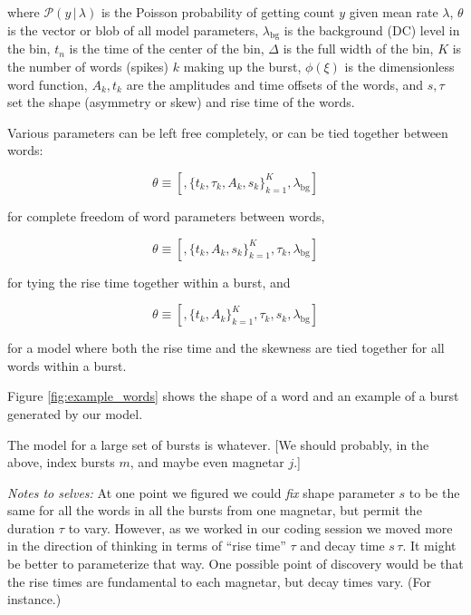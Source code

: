 \documentclass[12pt]{article}
\newcommand{\given}{\,|\,}
\renewcommand{\count}{y}
\newcommand{\pars}{\theta}
\newcommand{\mean}{\lambda}
\newcommand{\Poisson}{{\mathcal P}}
\newcommand{\bg}{\mathrm{bg}}
\begin{document}
where $\Poisson(\count\given\mean)$ is the Poisson probability of getting count $y$ given mean rate $\mean$,
  $\pars$ is the vector or blob of all model parameters,
  $\mean_{\bg}$ is the background (DC) level in the bin,
  $t_n$ is the time of the center of the bin,
  $\Delta$ is the full width of the bin,
  $K$ is the number of words (spikes) $k$ making up the burst,
  $\phi(\xi)$ is the dimensionless word function,
  $A_k, t_k$ are the amplitudes and time offsets of the words,
  and $s, \tau$ set the shape (asymmetry or skew) and rise time of the words.
  
Various parameters can be left free completely, or can be tied together between words:
 
\begin{equation}
\theta \equiv [,\{t_k, \tau_k, A_k, s_k \}_{k=1}^K, \mean_{\bg} ]
\end{equation}

for complete freedom of word parameters between words,

\begin{equation}
\theta \equiv [,\{t_k, A_k, s_k \}_{k=1}^K,  \tau_k, \mean_{\bg} ]
\end{equation}

for tying the rise time together within a burst, and

\begin{equation}
\theta \equiv [,\{t_k, A_k\}_{k=1}^K, \tau_k, s_k , \mean_{\bg} ]\end{equation}

for a model where both the rise time and the skewness are tied together for all words within a burst.


  
Figure \ref{fig:example_words} shows the shape of a word
  and an example of a burst generated by our model.

The model for a large set of bursts is whatever.
[We should probably, in the above, index bursts $m$,
  and maybe even magnetar $j$.]

\emph{Notes to selves:}
At one point we figured we could \emph{fix} shape parameter $s$
  to be the same for all the words in all the bursts from one magnetar,
  but permit the duration $\tau$ to vary.
However, as we worked in our coding session we moved more in the direction
  of thinking in terms of ``rise time'' $\tau$ and decay time $s\,\tau$.
It might be better to parameterize that way.
One possible point of discovery would be that the rise times
  are fundamental to each magnetar,
  but decay times vary.
(For instance.)
\end{document}
